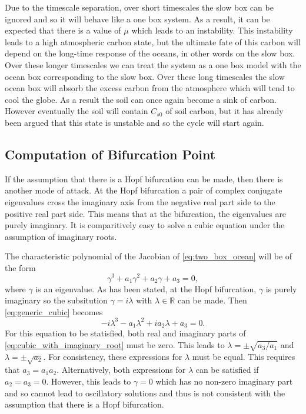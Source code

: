 Due to the timescale
separation, over short timescales the slow box can be ignored and so it will behave like a one box system. As a result, it can be expected that there
is a value of $\mu$ which leads to an instability. This instability leads to a high atmospheric carbon state, but the ultimate fate of this carbon will depend on the long-time response of the oceans, in other
words on the slow box. Over these longer timescales we can treat the system as a one box model with the ocean box corresponding to the slow box.
Over these long timescales the slow ocean box will absorb the excess carbon from the atmosphere which will tend to cool the globe. As a result
the soil can once again become a sink of carbon. However eventually the soil will contain $C_{s0}$ of soil carbon, but it has already been argued that this state is unstable
and so the cycle will start again.

\subsection{Computation of Bifurcation Point}
If the assumption that there is a Hopf bifurcation can be made, then there is another mode of attack. At the Hopf bifurcation a pair of complex conjugate eigenvalues
cross the imaginary axis from the negative real part side to the positive real part side. This means that at the bifurcation, the eigenvalues are purely imaginary. It is
comparitively easy to solve a cubic equation under the assumption of imaginary roots.

The characteristic polynomial of the Jacobian of \cref{eq:two_box_ocean} will be of the form
\begin{equation}
  \label{eq:generic_cubic}
  \gamma^3 + a_1 \gamma^2 + a_2 \gamma + a_3 = 0,
\end{equation}
where $\gamma$ is an eigenvalue. As has been stated, at the Hopf bifurcation, $\gamma$ is purely imaginary so the subsitution $\gamma = i\lambda$ with $\lambda \in \mathbb{R}$
can be made. Then \cref{eq:generic_cubic} becomes
\begin{equation}
  \label{eq:cubic_with_imaginary_root}
  -i\lambda^3 - a_1 \lambda^2 + i a_2 \lambda + a_3 = 0. 
\end{equation}
For this equation to be statisfied, both real and imaginary parts of \cref{eq:cubic_with_imaginary_root} must be zero. This leads to
$\lambda = \pm \sqrt{a_3/a_1}$ and $\lambda = \pm \sqrt{a_2}$. For consistency, these expressions for $\lambda$ must be equal. This requires that $a_3 = a_1a_2$.
Alternatively, both expressions for $\lambda$ can be satisfied if $a_2 = a_3 = 0$. However, this leads to $\gamma = 0$ which has no non-zero imaginary part and so cannot lead to
oscillatory solutions and thus is not consistent with the assumption that there is a Hopf bifurcation.

